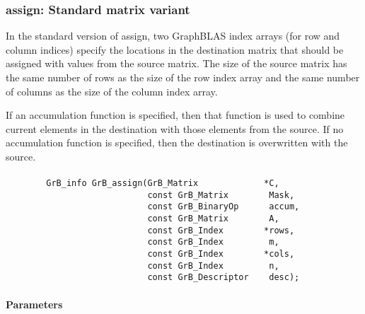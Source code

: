 \subsubsection{{\sf assign}: Standard matrix variant}

In the standard version of {\sf assign}, two GraphBLAS index arrays (for row and
column indices) specify the locations in the destination matrix that should be 
assigned with values from the source matrix.  The size of the source matrix has the same
number of rows as the size of the row index array and the same number
of columns as the size of the column index array.

If an accumulation function is specified, then that function is used
to combine current elements in the destination with those elements
from the source.  If no accumulation function is specified, then the
destination is overwritten with the source.

\paragraph{\syntax}

\begin{verbatim}
        GrB_info GrB_assign(GrB_Matrix             *C,
                            const GrB_Matrix        Mask,
                            const GrB_BinaryOp      accum,
                            const GrB_Matrix        A,
                            const GrB_Index        *rows,
                            const GrB_Index         m,
                            const GrB_Index        *cols,
                            const GrB_Index         n,
                            const GrB_Descriptor    desc);
\end{verbatim}

\paragraph{Parameters}

